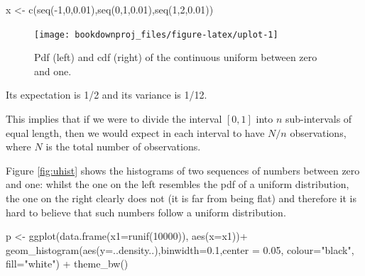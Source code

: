 \documentclass[
]{book}
\newenvironment{Shaded}{\begin{snugshade}}{\end{snugshade}}
\newcommand{\AttributeTok}[1]{\textcolor[rgb]{0.77,0.63,0.00}{#1}}
\newcommand{\DecValTok}[1]{\textcolor[rgb]{0.00,0.00,0.81}{#1}}
\newcommand{\FloatTok}[1]{\textcolor[rgb]{0.00,0.00,0.81}{#1}}
\newcommand{\FunctionTok}[1]{\textcolor[rgb]{0.00,0.00,0.00}{#1}}
\newcommand{\NormalTok}[1]{#1}
\newcommand{\OtherTok}[1]{\textcolor[rgb]{0.56,0.35,0.01}{#1}}
\newcommand{\SpecialCharTok}[1]{\textcolor[rgb]{0.00,0.00,0.00}{#1}}
\newcommand{\StringTok}[1]{\textcolor[rgb]{0.31,0.60,0.02}{#1}}
\theoremstyle{definition}
\theoremstyle{definition}
\theoremstyle{definition}
\theoremstyle{definition}
\theoremstyle{remark}
\begin{document}
\begin{Shaded}
\begin{Highlighting}[]
\NormalTok{x }\OtherTok{\textless{}{-}} \FunctionTok{c}\NormalTok{(}\FunctionTok{seq}\NormalTok{(}\SpecialCharTok{{-}}\DecValTok{1}\NormalTok{,}\DecValTok{0}\NormalTok{,}\FloatTok{0.01}\NormalTok{),}\FunctionTok{seq}\NormalTok{(}\DecValTok{0}\NormalTok{,}\DecValTok{1}\NormalTok{,}\FloatTok{0.01}\NormalTok{),}\FunctionTok{seq}\NormalTok{(}\DecValTok{1}\NormalTok{,}\DecValTok{2}\NormalTok{,}\FloatTok{0.01}\NormalTok{))}
\end{Highlighting}
\end{Shaded}

\begin{figure}

{\centering \texttt{[image: bookdownproj\_files/figure-latex/uplot-1]} 

}

\caption{Pdf (left) and cdf (right) of the continuous uniform between zero and one.}\label{fig:uplot}
\end{figure}

Its expectation is 1/2 and its variance is 1/12.

This implies that if we were to divide the interval \([0,1]\) into \(n\) sub-intervals of equal length, then we would expect in each interval to have \(N/n\) observations, where \(N\) is the total number of observations.

Figure \ref{fig:uhist} shows the histograms of two sequences of numbers between zero and one: whilst the one on the left resembles the pdf of a uniform distribution, the one on the right clearly does not (it is far from being flat) and therefore it is hard to believe that such numbers follow a uniform distribution.

\begin{Shaded}
\begin{Highlighting}[]
\NormalTok{p }\OtherTok{\textless{}{-}} \FunctionTok{ggplot}\NormalTok{(}\FunctionTok{data.frame}\NormalTok{(}\AttributeTok{x1=}\FunctionTok{runif}\NormalTok{(}\DecValTok{10000}\NormalTok{)), }\FunctionTok{aes}\NormalTok{(}\AttributeTok{x=}\NormalTok{x1))}\SpecialCharTok{+}
   \FunctionTok{geom\_histogram}\NormalTok{(}\FunctionTok{aes}\NormalTok{(}\AttributeTok{y=}\NormalTok{..density..),}\AttributeTok{binwidth=}\FloatTok{0.1}\NormalTok{,}\AttributeTok{center =} \FloatTok{0.05}\NormalTok{, }\AttributeTok{colour=}\StringTok{"black"}\NormalTok{, }\AttributeTok{fill=}\StringTok{"white"}\NormalTok{)  }\SpecialCharTok{+} \FunctionTok{theme\_bw}\NormalTok{() }
\end{Highlighting}
\end{Shaded}
\end{document}
